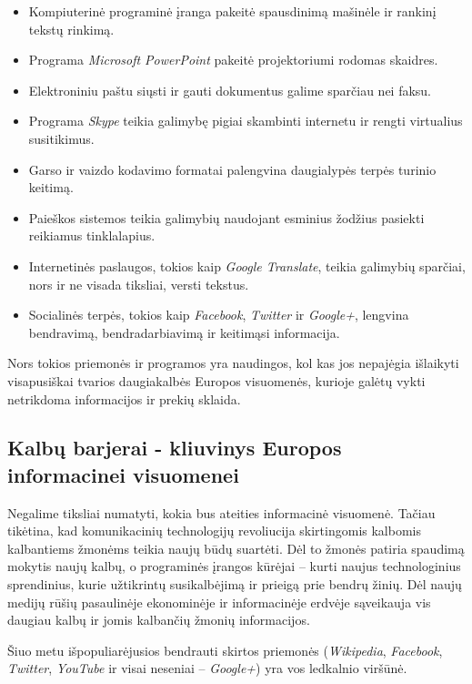 \documentclass[]{../metanetpaper}
\begin{document}
\begin{multicols}{2}
\begin{itemize}
\item Kompiuterinė programinė įranga pakeitė spausdinimą mašinėle ir rankinį tekstų rinkimą.
\item Programa \textit{ Microsoft PowerPoint} pakeitė projektoriumi rodomas skaidres.
\item Elektroniniu paštu siųsti ir gauti dokumentus galime sparčiau nei faksu.
\item Programa \textit{Skype} teikia galimybę pigiai skambinti internetu ir rengti virtualius susitikimus.
\item Garso ir vaizdo kodavimo formatai palengvina daugialypės terpės turinio keitimą.
\item Paieškos sistemos teikia galimybių naudojant esminius žodžius pasiekti reikiamus tinklalapius.
\item Internetinės paslaugos, tokios kaip \textit{Google Translate}, teikia galimybių sparčiai, nors ir ne visada tiksliai, versti tekstus.
\item Socialinės terpės, tokios kaip \textit{Facebook}, \textit{Twitter} ir \textit{Google+}, lengvina bendravimą, bendradarbiavimą ir keitimąsi informacija.
\end{itemize}

Nors tokios priemonės ir programos yra naudingos, kol kas jos nepajėgia išlaikyti visapusiškai tvarios daugiakalbės Europos visuomenės, kurioje galėtų vykti netrikdoma informacijos ir prekių sklaida.

\subsection{Kalbų barjerai - kliuvinys Europos informacinei visuomenei}
  
 Negalime tiksliai numatyti, kokia bus ateities informacinė visuomenė. Tačiau tikėtina, kad komunikacinių technologijų revoliucija skirtingomis kalbomis kalbantiems žmonėms teikia naujų būdų suartėti. Dėl to žmonės patiria spaudimą mokytis naujų kalbų, o programinės įrangos kūrėjai – kurti naujus technologinius sprendinius, kurie užtikrintų susikalbėjimą ir prieigą prie bendrų žinių. Dėl naujų medijų rūšių pasaulinėje ekonominėje ir informacinėje erdvėje sąveikauja vis daugiau kalbų ir jomis kalbančių žmonių informacijos. 


Šiuo metu išpopuliarėjusios bendrauti skirtos priemonės (\textit{Wikipedia}, \textit{Facebook}, \textit{Twitter}, \textit{YouTube} ir visai neseniai – \textit{Google+}) yra vos ledkalnio viršūnė.


\end{multicols}
\end{document}
